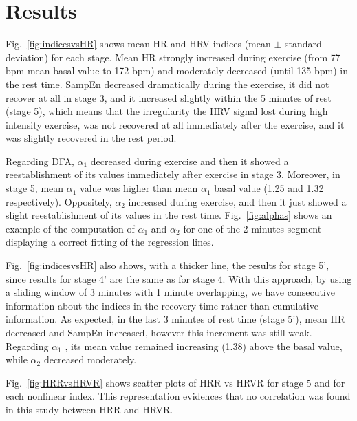 


\section{Results}

Fig.~\ref{fig:indicesvsHR} shows mean HR and HRV indices (mean $\pm$ standard deviation) for each stage. Mean HR strongly increased during exercise (from 77 bpm mean basal value to 172 bpm) and moderately decreased (until 135 bpm) in the rest time.
SampEn decreased dramatically during the exercise, it did not recover at all in stage 3, and it increased slightly within the 5 minutes of rest (stage 5), which means that the irregularity the HRV signal lost during high intensity exercise, was not recovered at all immediately after the exercise, and it was slightly recovered in the rest period.

Regarding DFA, $\alpha_1$ decreased during exercise and then it showed a reestablishment of its values immediately after exercise in stage 3. Moreover, in stage 5, mean $\alpha_1$ value was higher than mean $\alpha_1$ basal value (1.25 and 1.32 respectively).  Oppositely, $\alpha_2$ increased during exercise, and then it just showed a slight reestablishment of its values in the rest time.  Fig.~\ref{fig:alphas} shows an example of the computation of $\alpha_1$ and $\alpha_2$ for one of the 2 minutes segment displaying a correct fitting of the regression lines. 

Fig.~\ref{fig:indicesvsHR} also shows, with a thicker line, the results for stage 5', since results for stage 4' are the same as for stage 4. With this approach, by using a sliding window of 3 minutes with 1 minute overlapping, we have consecutive information about the indices in the recovery time rather than cumulative information. As expected, in the last 3 minutes of rest time (stage 5'), mean HR decreased and SampEn increased, however this increment was still weak. Regarding $\alpha_1$ , its mean value remained increasing (1.38) above the basal value, while $\alpha_2$ decreased moderately.

Fig.~\ref{fig:HRRvsHRVR} shows scatter plots of HRR vs HRVR for stage 5 and for each nonlinear index. This representation evidences that no correlation was found in this study between HRR and HRVR.
 
